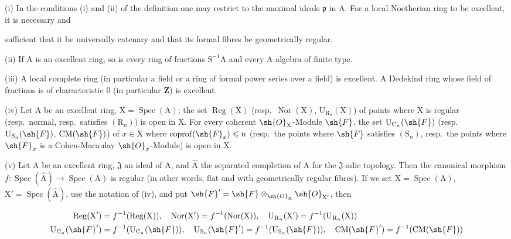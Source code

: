\begin{env}[7.8.3]
\label{IV.7.8.3}
(i) In the conditions (i) and (ii) of the definition  one may restrict to the maximal ideals $\mathfrak{p}$ in $\mathrm{A}$. For a local Noetherian ring to be excellent, it is necessary and


sufficient that it be universally catenary and that its formal fibres be geometrically regular.

(ii) If $\mathrm{A}$ is an excellent ring, so is every ring of fractions $\mathrm{S}^{-1}\mathrm{A}$ and every $\mathrm{A}$-algebra of finite type.

(iii) A local complete ring (in particular a field or a ring of formal power series over a field) is excellent. A Dedekind ring whose field of fractions is of characteristic $0$ (in particular $\mathbf{Z}$) is excellent.

(iv) Let $\mathrm{A}$ be an excellent ring, $\mathrm{X}=\operatorname{Spec}(\mathrm{A})$; the set $\operatorname{Reg}(\mathrm{X})$ (resp.\ $\operatorname{Nor}(\mathrm{X})$, $\mathrm{U}_{\mathrm{R}_n}(\mathrm{X})$) of points where $\mathrm{X}$ is regular (resp.\ normal, resp.\ satisfies $(\mathrm{R}_n)$) is open in $\mathrm{X}$. For every coherent $\sh{O}_\mathrm{X}$-Module $\sh{F}$, the set $\mathrm{U}_{\mathrm{C}_n}(\sh{F})$ (resp.\ $\mathrm{U}_{\mathrm{S}_n}(\sh{F})$, $\mathrm{CM}(\sh{F})$) of $x\in\mathrm{X}$ where $\operatorname{coprof}(\sh{F}_x)\leqslant n$ (resp.\ the points where $\sh{F}$ satisfies $(\mathrm{S}_n)$, resp.\ the points where $\sh{F}_x$ is a Cohen-Macaulay $\sh{O}_x$-Module) is open in $\mathrm{X}$.

(v) Let $\mathrm{A}$ be an excellent ring, $\mathfrak{J}$ an ideal of $\mathrm{A}$, and $\widehat{\mathrm{A}}$ the separated completion of $\mathrm{A}$ for the $\mathfrak{J}$-adic topology. Then the canonical morphism $f:\operatorname{Spec}(\widehat{\mathrm{A}})\to\operatorname{Spec}(\mathrm{A})$ is regular (in other words, flat and with geometrically regular fibres). If we set $\mathrm{X}=\operatorname{Spec}(\mathrm{A})$, $\mathrm{X}'=\operatorname{Spec}(\widehat{\mathrm{A}})$, use the notation of (iv), and put $\sh{F}'=\sh{F}\otimes_{\sh{O}_\mathrm{X}}\sh{O}_{\mathrm{X}'}$, then

\begin{env}[7.8.3.1]
\label{IV.7.8.3.1}
\begin{align*}
  \operatorname{Reg}(\mathrm{X}')&=f^{-1}(\operatorname{Reg}(\mathrm{X})),\quad \operatorname{Nor}(\mathrm{X}')=f^{-1}(\operatorname{Nor}(\mathrm{X})),\quad \mathrm{U}_{\mathrm{R}_n}(\mathrm{X}')=f^{-1}(\mathrm{U}_{\mathrm{R}_n}(\mathrm{X}))\\
  \mathrm{U}_{\mathrm{C}_n}(\sh{F}')&=f^{-1}(\mathrm{U}_{\mathrm{C}_n}(\sh{F})),\quad \mathrm{U}_{\mathrm{S}_n}(\sh{F}')=f^{-1}(\mathrm{U}_{\mathrm{S}_n}(\sh{F})),\quad \mathrm{CM}(\sh{F}')=f^{-1}(\mathrm{CM}(\sh{F}))
\end{align*}
\end{env}


\end{env}
